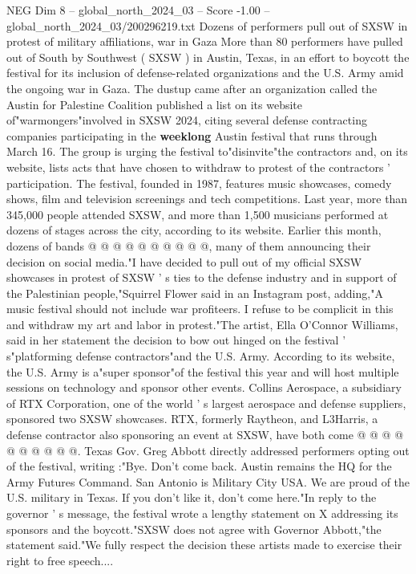\begin{textsample}{NEG Dim 8 – global\_north\_2024\_03 – Score -1.00 – global\_north\_2024\_03/200296219.txt}  \label{ex:f8_neg_222}
Dozens of performers pull out of SXSW in protest of military affiliations, war in Gaza More than 80 performers have pulled out of South by Southwest ( SXSW ) in Austin, Texas, in an effort to boycott the festival for its inclusion of defense-related organizations and the U.S.
Army amid the ongoing war in Gaza.
The dustup came after an organization called the Austin for Palestine Coalition published a list on its website of"warmongers"involved in SXSW 2024, citing several defense contracting companies participating in the \textbf{weeklong} Austin festival that runs through March 16.
The group is urging the festival to"disinvite"the contractors and, on its website, lists acts that have chosen to withdraw to protest of the contractors ' participation.
The festival, founded in 1987, features music showcases, comedy shows, film and television screenings and tech competitions.
Last year, more than 345,000 people attended SXSW, and more than 1,500 musicians performed at dozens of stages across the city, according to its website.
Earlier this month, dozens of bands @ @ @ @ @ @ @ @ @ @, many of them announcing their decision on social media."I have decided to pull out of my official SXSW showcases in protest of SXSW ' s ties to the defense industry and in support of the Palestinian people,"Squirrel Flower said in an Instagram post, adding,"A music festival should not include war profiteers.
I refuse to be complicit in this and withdraw my art and labor in protest."The artist, Ella O'Connor Williams, said in her statement the decision to bow out hinged on the festival ' s"platforming defense contractors"and the U.S.
Army.
According to its website, the U.S.
Army is a"super sponsor"of the festival this year and will host multiple sessions on technology and sponsor other events.
Collins Aerospace, a subsidiary of RTX Corporation, one of the world ' s largest aerospace and defense suppliers, sponsored two SXSW showcases.
RTX, formerly Raytheon, and L3Harris, a defense contractor also sponsoring an event at SXSW, have both come @ @ @ @ @ @ @ @ @ @.
Texas Gov.
Greg Abbott directly addressed performers opting out of the festival, writing :"Bye.
Don't come back.
Austin remains the HQ for the Army Futures Command.
San Antonio is Military City USA.
We are proud of the U.S. military in Texas.
If you don't like it, don't come here."In reply to the governor ' s message, the festival wrote a lengthy statement on X addressing its sponsors and the boycott."SXSW does not agree with Governor Abbott,"the statement said."We fully respect the decision these artists made to exercise their right to free speech....

\end{textsample}
